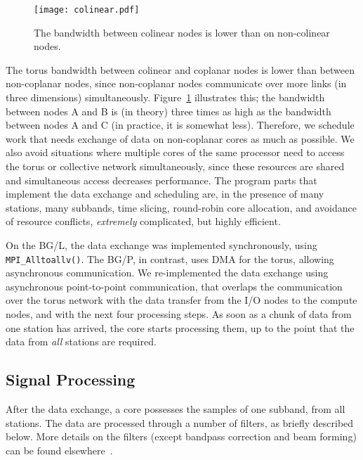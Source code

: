 \documentclass{sig-alternate}
\begin{document}
\begin{figure}
\begin{center}
\texttt{[image: colinear.pdf]}
\end{center}
\caption{The bandwidth between colinear nodes is lower than on non-colinear nodes.}
\label{fig:colinear}
\end{figure}

The torus bandwidth between colinear and coplanar nodes is lower than between
non-coplanar nodes, since non-coplanar nodes communicate over more links
(in three dimensions) simultaneously.
Figure~\ref{fig:colinear} illustrates this; the bandwidth between nodes
\textsf{A} and \textsf{B} is (in theory) three times as high as the bandwidth
between nodes \textsf{A} and \textsf{C} (in practice, it is somewhat less).
Therefore, we schedule work that needs exchange of data 
on non-coplanar cores as much as possible.
We also avoid situations where multiple cores of the same processor need to
access the torus or collective network simultaneously, since these resources
are shared and simultaneous access decreases performance.
The program parts that implement the data exchange and scheduling are, in the
presence of many stations, many subbands, time slicing, round-robin core
allocation, and avoidance of resource conflicts, \emph{extremely\/}
complicated, but highly efficient.

On the BG/L, the data exchange was implemented synchronously, using
\texttt{MPI\_Alltoallv()}.
The BG/P, in contrast, uses DMA for the torus, allowing asynchronous
communication.
We re-implemented the data exchange using asynchronous point-to-point
communication, that overlaps the communication over the torus network with 
the data transfer from the I/O nodes to the compute nodes, and with
the next four processing steps.
As soon as a chunk of data from one station has arrived, the core starts
processing them, up to the point that the data from \emph{all\/} stations
are required.


\subsection{Signal Processing}
\label{sec:signal-processing}

After the data exchange, a core possesses the samples of one subband, from all
stations.
The data are processed through a number of filters, as briefly described below.
More details on the filters (except bandpass correction and beam forming)
can be found elsewhere~\cite{Romein:06}.
\end{document}
